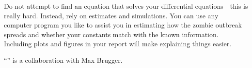 Do not attempt to find an equation that solves your differential equations---this is really hard.
Instead, rely on estimates and simulations.  You can use any computer program you like to assist you in estimating how the zombie outbreak spreads and whether your constants match with the known information.  Including plots and figures in your report will make explaining things easier.



\vfill

\begin{graybox}
\hfill ``\zombiestitle'' is a collaboration with Max Brugger.
\end{graybox}

\begin{noexercises}
\end{noexercises}